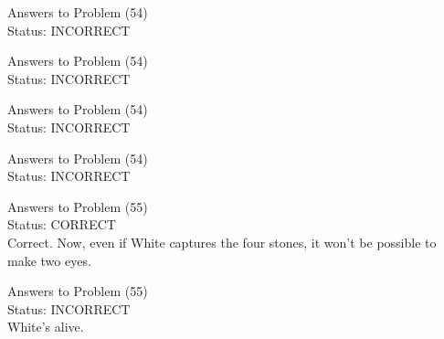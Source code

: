 \documentclass[11pt]{article}
\begin{document}
\begin{minipage}[t]{0.5\textwidth}
  {\centering
  
  Answers to Problem (54)\\
  Status: INCORRECT\\
  
  }
\end{minipage}
\begin{minipage}[t]{0.5\textwidth}
  {\centering
  
  Answers to Problem (54)\\
  Status: INCORRECT\\
  
  }
\end{minipage}
\begin{minipage}[t]{0.5\textwidth}
  {\centering
  
  Answers to Problem (54)\\
  Status: INCORRECT\\
  
  }
\end{minipage}
\begin{minipage}[t]{0.5\textwidth}
  {\centering
  
  Answers to Problem (54)\\
  Status: INCORRECT\\
  
  }
\end{minipage}
\begin{minipage}[t]{0.5\textwidth}
  {\centering
  
  Answers to Problem (55)\\
  Status: CORRECT\\
  Correct. Now, even if White captures the four stones, it won't be possible to make two eyes.\\
  }
\end{minipage}
\begin{minipage}[t]{0.5\textwidth}
  {\centering
  
  Answers to Problem (55)\\
  Status: INCORRECT\\
  White's alive.\\
  }
\end{minipage}
\end{document}

